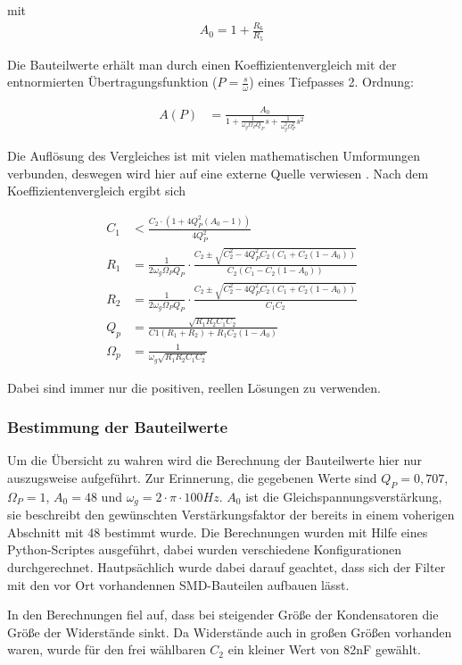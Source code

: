 mit
\begin{align*}
A_0=1+\frac{R_6}{R_5}
\end{align*}


Die Bauteilwerte erhält man durch einen Koeffizientenvergleich mit der entnormierten
Übertragungsfunktion ($P=\frac{s}{\omega}$) eines Tiefpasses 2. Ordnung:

\begin{align*}
A(P)&=\frac{A_0}{1+\frac{1}{\omega_g\Omega_PQ_P}s+\frac{1}{\omega_g^2\Omega_P^2}s^2}
\end{align*}

Die Auflösung des Vergleiches ist mit vielen mathematischen Umformungen verbunden, deswegen wird hier auf eine
externe Quelle verwiesen \cite[S. 102]{Krucker2000}.
Nach dem Koeffizientenvergleich ergibt sich

\begin{align*}
C_1&<\frac{C_2\cdot(1+4Q^2_P(A_0-1))}{4Q^2_P}\\
R_1&=\frac{1}{2\omega_g\Omega_PQ_P} \cdot \frac{C_2\pm\sqrt{C_2^2-4Q^2_PC_2(C_1+C_2(1-A_0))}}{C_2(C_1-C_2(1-A_0))}   \\
R_2&=\frac{1}{2\omega_g\Omega_PQ_P} \cdot \frac{C_2\pm\sqrt{C_2^2-4Q^2_PC_2(C_1+C_2(1-A_0))}}{C_1C_2}  \\
Q_p&=\frac{\sqrt{R_1R_2C_1C_2}}{C1(R_1+R_2)+R_1C_2(1-A_0)}\\
\Omega_p&=\frac{1}{\omega_g\sqrt{R_1R_2C_1C_2}}
\end{align*}

Dabei sind immer nur die positiven, reellen Lösungen zu verwenden.


\subsubsection{Bestimmung der Bauteilwerte}

Um die Übersicht zu wahren wird die Berechnung der Bauteilwerte hier nur auszugsweise aufgeführt. Zur Erinnerung,
die gegebenen Werte sind $Q_P=0,707$, $\Omega_P=1$, $A_0=48$ und $\omega_g = 2 \cdot \pi \cdot 100Hz$.
$A_0$ ist die Gleichspannungsverstärkung, sie beschreibt den gewünschten Verstärkungsfaktor der bereits in einem voherigen
Abschnitt mit 48 bestimmt wurde. Die Berechnungen wurden mit Hilfe eines Python-Scriptes ausgeführt, dabei wurden verschiedene
Konfigurationen durchgerechnet. Hautpsächlich wurde dabei darauf geachtet, dass sich der Filter mit den vor Ort vorhandennen SMD-Bauteilen
aufbauen lässt.

In den Berechnungen fiel auf, dass bei steigender Größe der Kondensatoren die Größe der Widerstände sinkt. Da Widerstände auch in großen Größen vorhanden waren,
wurde für den frei wählbaren $C_2$ ein kleiner Wert von 82nF gewählt.

